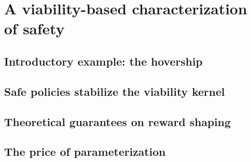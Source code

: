 \chapter{A viability-based characterization of safety}


\section{Introductory example: the hovership}

\section{Safe policies stabilize the viability kernel}

\section{Theoretical guarantees on reward shaping}

\section{The price of parameterization}